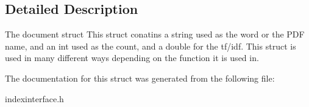 \subsection{Detailed Description}
The document struct This struct conatins a string used as the word or the P\+DF name, and an int used as the count, and a double for the tf/idf. This struct is used in many different ways depending on the function it is used in. 

The documentation for this struct was generated from the following file\+:\begin{DoxyCompactItemize}
\item 
indexinterface.\+h\end{DoxyCompactItemize}
